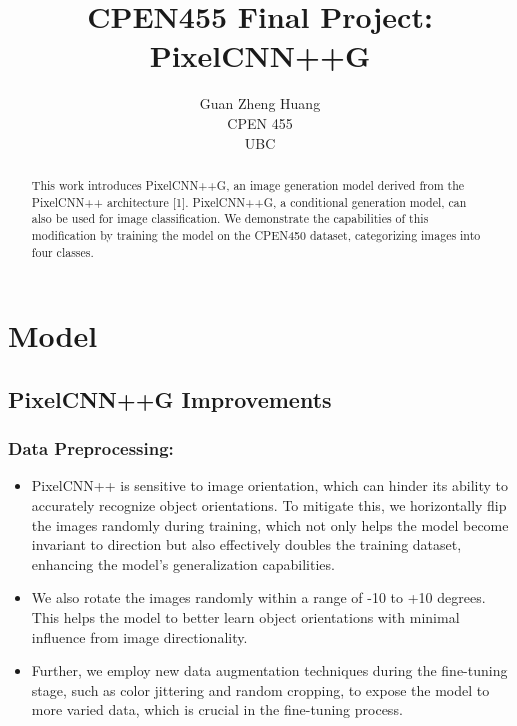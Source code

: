 \documentclass{article}
\title{CPEN455 Final Project: PixelCNN++G}
\author{
  Guan Zheng Huang \\
  CPEN 455\\
  UBC\\
}
\begin{document}
\pagestyle{fancy}
\fancyhead{} 

\maketitle
\thispagestyle{fancy}
\begin{abstract}
    This work introduces PixelCNN++G, an image generation model derived from the PixelCNN++ architecture [1]. PixelCNN++G, a conditional generation model, can also be used for image classification. We demonstrate the capabilities of this modification by training the model on the CPEN450 dataset, categorizing images into four classes.
\end{abstract}

\section{Model}

\subsection{PixelCNN++G Improvements}

    \subsubsection{Data Preprocessing:}
    \begin{itemize}
        \item PixelCNN++ is sensitive to image orientation, which can hinder its ability to accurately recognize object orientations. To mitigate this, we horizontally flip the images randomly during training, which not only helps the model become invariant to direction but also effectively doubles the training dataset, enhancing the model's generalization capabilities.
        \item We also rotate the images randomly within a range of -10 to +10 degrees. This helps the model to better learn object orientations with minimal influence from image directionality.
        \item Further, we employ new data augmentation techniques during the fine-tuning stage, such as color jittering and random cropping, to expose the model to more varied data, which is crucial in the fine-tuning process. 
    \end{itemize}
\end{document}
